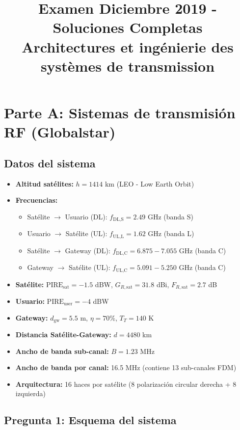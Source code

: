\documentclass[a4paper,11pt]{article}
\title{\textbf{Examen Diciembre 2019 - Soluciones Completas\\Architectures et ingénierie des systèmes de transmission}}
\author{}
\date{}
\begin{document}
\maketitle

\section*{Parte A: Sistemas de transmisión RF (Globalstar)}

\subsection*{Datos del sistema}
\begin{itemize}
    \item \textbf{Altitud satélites:} $h = 1414$ km (LEO - Low Earth Orbit)
    \item \textbf{Frecuencias:}
    \begin{itemize}
        \item Satélite $\rightarrow$ Usuario (DL): $f_{\text{DL,S}} = 2.49$ GHz (banda S)
        \item Usuario $\rightarrow$ Satélite (UL): $f_{\text{UL,L}} = 1.62$ GHz (banda L)
        \item Satélite $\rightarrow$ Gateway (DL): $f_{\text{DL,C}} = 6.875-7.055$ GHz (banda C)
        \item Gateway $\rightarrow$ Satélite (UL): $f_{\text{UL,C}} = 5.091-5.250$ GHz (banda C)
    \end{itemize}
    \item \textbf{Satélite:} $\text{PIRE}_{\text{sat}} = -1.5$ dBW, $G_{R,\text{sat}} = 31.8$ dBi, $F_{R,\text{sat}} = 2.7$ dB
    \item \textbf{Usuario:} $\text{PIRE}_{\text{user}} = -4$ dBW
    \item \textbf{Gateway:} $d_{\text{gw}} = 5.5$ m, $\eta = 70\%$, $T_T = 140$ K
    \item \textbf{Distancia Satélite-Gateway:} $d = 4480$ km
    \item \textbf{Ancho de banda sub-canal:} $B = 1.23$ MHz
    \item \textbf{Ancho de banda por canal:} 16.5 MHz (contiene 13 sub-canales FDM)
    \item \textbf{Arquitectura:} 16 haces por satélite (8 polarización circular derecha + 8 izquierda)
\end{itemize}

\subsection*{Pregunta 1: Esquema del sistema}
\end{document}
